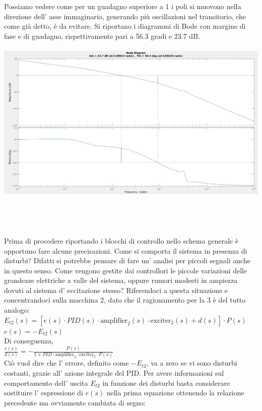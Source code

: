 \documentclass[Lau,noexaminfo]{sapthesis}
\begin{document}
	Possiamo vedere come per un guadagno superiore a 1 i poli si muovono nella direzione dell' asse immaginario, generando più oscillazioni nel transitorio, che come già detto, è da evitare. Si riportano i diagrammi di Bode con margine di fase e di guadagno, rispettivamente pari a 56.3 gradi e 23.7 dB.\\\\
	\includegraphics[scale=0.258]{margin_F3}\\\\\\\\\\
	Prima di procedere riportando i blocchi di controllo nello schema generale è opportuno fare alcune precisazioni. Come si comporta il sistema in presenza di disturbi? Difatti si potrebbe pensare di fare un' analisi per piccoli segnali anche in questo senso. Come vengono gestite dai controllori le piccole variazioni delle grandezze elettriche a valle del sistema, oppure rumori modesti in ampiezza dovuti al sistema d' eccitazione stesso? 
	Riferendoci a questa situazione e concentrandoci sulla macchina 2, dato che il ragionamento per la 3 è del tutto analogo:\\
	$E_{t2}(s)=[e(s)\cdot PID(s)\cdot \text{amplifier}_2(s)\cdot \text{exciter}_2(s)+d(s)]\cdot P(s)$\\
	$e(s)=-E_{t2}(s)$\\
	Di conseguenza,\\
	$\frac{e(s)}{d(s)}=-\frac{P(s)}{1+PID\cdot \text{amplifier}_2\cdot \text{exciter}_2\cdot P(s)}$\\
	Ciò vuol dire che l' errore, definito come $-E_{t2}$, va a zero se vi sono disturbi costanti, grazie all' azione integrale del PID. Per avere informazioni sul comportamento dell' uscita $E_{t2}$ in funzione dei disturbi basta considerare sostituire l' espressione di $e(s)$ nella prima equazione ottenendo la relazione precedente ma ovviamente cambiata di segno:\\
\end{document}
